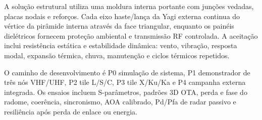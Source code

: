 A solução estrutural utiliza uma moldura interna portante com junções vedadas, placas nodais e reforços. Cada eixo haste/lança da Yagi externa continua do vértice da pirâmide interna através da face triangular, enquanto os painéis dielétricos fornecem proteção ambiental e transmissão RF controlada. A aceitação inclui resistência estática e estabilidade dinâmica: vento, vibração, resposta modal, expansão térmica, chuva, manutenção e ciclos térmicos repetidos.

O caminho de desenvolvimento é P0 simulação de sistema, P1 demonstrador de três nós VHF/UHF, P2 tile L/S/C, P3 tile X/Ku/Ka e P4 campanha externa integrada. Os ensaios incluem S-parâmetros, padrões 3D OTA, perda e fase do radome, coerência, sincronismo, AOA calibrado, Pd/Pfa de radar passivo e resiliência após perda de enlace ou energia.
